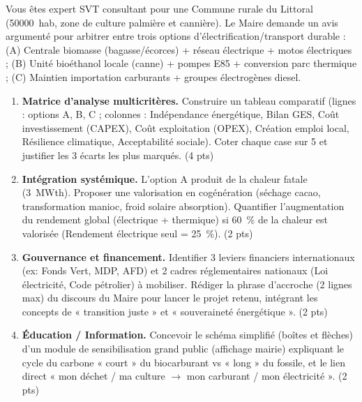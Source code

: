 \documentclass[11pt]{article}
\begin{document}
\begin{exercice}
Vous êtes expert SVT consultant pour une Commune rurale du Littoral (\SI{50000}{hab}, zone de culture palmière et cannière). Le Maire demande un avis argumenté pour arbitrer entre trois options d'électrification/transport durable : (A) Centrale biomasse (bagasse/écorces) + réseau électrique + motos électriques ; (B) Unité bioéthanol locale (canne) + pompes E85 + conversion parc thermique ; (C) Maintien importation carburants + groupes électrogènes diesel.

\begin{enumerate}
\item \textbf{Matrice d'analyse multicritères.} Construire un tableau comparatif (lignes : options A, B, C ; colonnes : Indépendance énergétique, Bilan GES, Coût investissement (CAPEX), Coût exploitation (OPEX), Création emploi local, Résilience climatique, Acceptabilité sociale). Coter chaque case sur 5 et justifier les 3 écarts les plus marqués. (4 pts)
\item \textbf{Intégration systémique.} L'option A produit de la chaleur fatale (\SI{3}{MWth}). Proposer une valorisation en cogénération (séchage cacao, transformation manioc, froid solaire absorption). Quantifier l'augmentation du rendement global (électrique + thermique) si \SI{60}{\%} de la chaleur est valorisée (Rendement électrique seul = \SI{25}{\%}). (2 pts)
\item \textbf{Gouvernance et financement.} Identifier 3 leviers financiers internationaux (ex: Fonds Vert, MDP, AFD) et 2 cadres réglementaires nationaux (Loi électricité, Code pétrolier) à mobiliser. Rédiger la phrase d'accroche (2 lignes max) du discours du Maire pour lancer le projet retenu, intégrant les concepts de « transition juste » et « souveraineté énergétique ». (2 pts)
\item \textbf{Éducation / Information.} Concevoir le schéma simplifié (boîtes et flèches) d'un module de sensibilisation grand public (affichage mairie) expliquant le cycle du carbone « court » du biocarburant vs « long » du fossile, et le lien direct « mon déchet / ma culture $\to$ mon carburant / mon électricité ». (2 pts)
\end{enumerate}
\end{exercice}
\end{document}
